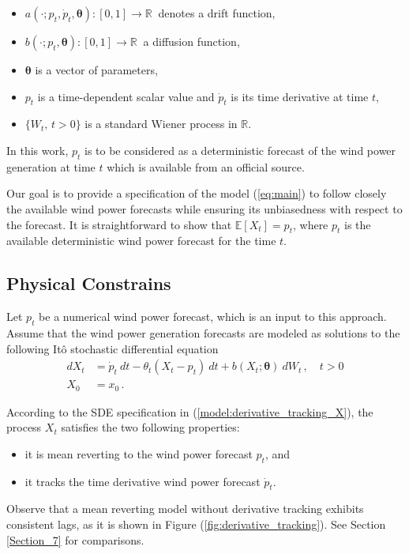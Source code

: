 \documentclass[11pt,english]{article}
\begin{document}
\begin{itemize}
\item $a(\cdot; p_t, \dot{p}_t,\bm{\theta}):[0,1] \to \mathbb{R} \ $  denotes a drift function,
\item $b (\cdot;p_t, \bm{\theta} ):[0,1] \to \mathbb{R} \ $  a  diffusion function,
\item $\bm{\theta}$ is a vector of parameters,
\item $p_t$ is a time-dependent scalar value and $ \dot{p}_t$ is its time derivative at time $t$,
\item $\{W_t, \, t >0\}$ is a standard Wiener process in $\mathbb{R}$.
\end{itemize}

In this work, $p_t$ is to be considered as a deterministic forecast of the wind power generation at time $t$ which is available from an official source. 

Our goal is to provide a specification of the model (\ref{eq:main}) to follow closely the available wind power forecasts while ensuring its unbiasedness with respect to the forecast. It is straightforward to show that $\mathbb{E} \left[X_t\right] = p_t$, where $p_t$ is the available deterministic wind power forecast for the time $t$.

\subsection{Physical Constrains}

Let $p_t$ be a numerical wind power forecast, which is an input to this approach. Assume that the wind power generation forecasts are modeled as solutions to the following It\^{o} stochastic differential equation
\begin{align}
dX_t&= \dot{p}_t \ dt - \theta_t (X_t - p_t) \ dt + b (X_t; \bm{\theta} ) \ dW_t\,, \quad t > 0 \nonumber \\
X_0 &= x_0\,. \label{model:derivative_tracking_X}
\end{align}

According to the SDE specification in (\ref{model:derivative_tracking_X}), the process $X_t$ satisfies the two following properties: \begin{itemize}
\item it is mean reverting to the wind power forecast $p_t$, and 
\item it tracks the time derivative wind power forecast $\dot{p}_t$.  
\end{itemize} 
Observe that a mean reverting model without derivative tracking exhibits consistent lags, as it is shown in Figure (\ref{fig:derivative_tracking}). See Section \ref{Section_7} for comparisons.
\end{document}
